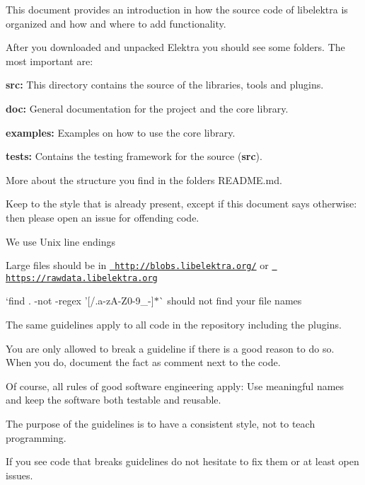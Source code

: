 This document provides an introduction in how the source code of libelektra is organized and how and where to add functionality.

After you downloaded and unpacked Elektra you should see some folders. The most important are\+:


\begin{DoxyItemize}
\item {\bfseries{src\+:}} This directory contains the source of the libraries, tools and plugins.
\item {\bfseries{doc\+:}} General documentation for the project and the core library.
\item {\bfseries{examples\+:}} Examples on how to use the core library.
\item {\bfseries{tests\+:}} Contains the testing framework for the source ({\bfseries{src}}).
\end{DoxyItemize}

More about the structure you find in the folder\textquotesingle{}s {\ttfamily R\+E\+A\+D\+M\+E.\+md}.


\begin{DoxyItemize}
\item Keep to the style that is already present, except if this document says otherwise\+: then please open an issue for offending code.
\item We use Unix line endings
\item Large files should be in \href{http://blobs.libelektra.org/}{\texttt{ http\+://blobs.\+libelektra.\+org/}} or \href{https://rawdata.libelektra.org}{\texttt{ https\+://rawdata.\+libelektra.\+org}}
\item `find . -\/not -\/regex '\mbox{[}/.a-\/z\+A-\/\+Z0-\/9\+\_\+-\/\mbox{]}$\ast$\textquotesingle{}\`{} should not find your file names
\end{DoxyItemize}

The same guidelines apply to all code in the repository including the plugins.

You are only allowed to break a guideline if there is a good reason to do so. When you do, document the fact as comment next to the code.

Of course, all rules of good software engineering apply\+: Use meaningful names and keep the software both testable and reusable.

The purpose of the guidelines is to have a consistent style, not to teach programming.

If you see code that breaks guidelines do not hesitate to fix them or at least open issues.

